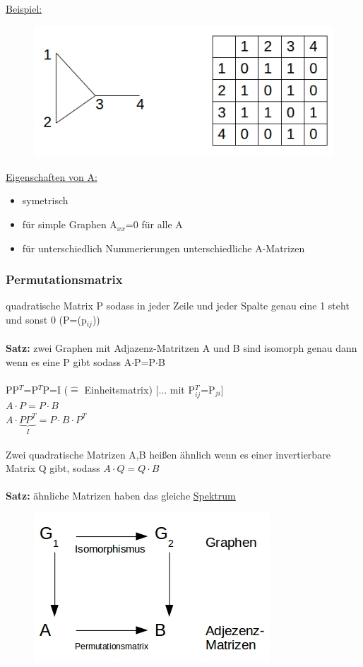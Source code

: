 \underline{Beispiel:}\\
\begin{figure}[htp]
\centering
\includegraphics[scale=1]{lectures/161021/pix/pic11.jpg}
\end{figure}

\underline{Eigenschaften von A:}
\begin{itemize}
	\item symetrisch
	\item für simple Graphen A$_{xx}$=0 für alle A
	\item für unterschiedlich Nummerierungen unterschiedliche A-Matrizen
\end{itemize}

\subsubsection{Permutationsmatrix}
quadratische Matrix P sodass in jeder Zeile und jeder Spalte genau eine 1 steht und sonst 0 (P=(p$_{ij}$))
\\\\
\textbf{Satz:} zwei Graphen mit Adjazenz-Matritzen A und B sind isomorph genau dann wenn es eine P gibt sodass A$\cdot$P=P$\cdot$B
\\\\
PP$^T$=P$^T$P=I ($\widehat{=}$ Einheitsmatrix) [... mit P$^T_{ij}$=P$_{ji}$]\\
$A \cdot P = P \cdot B$\\
$A \cdot \underbrace{PP^T}_{I}=P \cdot B \cdot P^T$
\\\\
Zwei quadratische Matrizen A,B heißen ähnlich wenn es einer invertierbare Matrix Q gibt, sodass $A \cdot Q = Q \cdot B$
\\\\
\textbf{Satz:} ähnliche Matrizen haben das gleiche \underline{Spektrum}
\begin{figure}[htp]
\centering
\includegraphics[scale=1]{lectures/161021/pix/pic12.jpg}
\end{figure}

